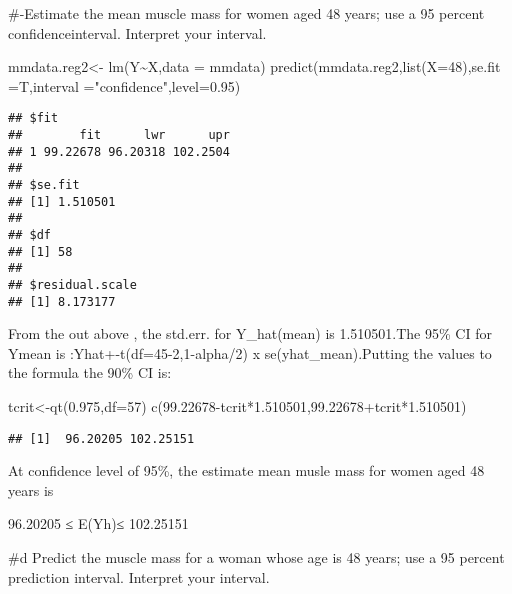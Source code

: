\documentclass[
]{article}
\newenvironment{Shaded}{\begin{snugshade}}{\end{snugshade}}
\newcommand{\AttributeTok}[1]{\textcolor[rgb]{0.77,0.63,0.00}{#1}}
\newcommand{\DecValTok}[1]{\textcolor[rgb]{0.00,0.00,0.81}{#1}}
\newcommand{\FloatTok}[1]{\textcolor[rgb]{0.00,0.00,0.81}{#1}}
\newcommand{\FunctionTok}[1]{\textcolor[rgb]{0.00,0.00,0.00}{#1}}
\newcommand{\NormalTok}[1]{#1}
\newcommand{\OtherTok}[1]{\textcolor[rgb]{0.56,0.35,0.01}{#1}}
\newcommand{\SpecialCharTok}[1]{\textcolor[rgb]{0.00,0.00,0.00}{#1}}
\newcommand{\StringTok}[1]{\textcolor[rgb]{0.31,0.60,0.02}{#1}}
\begin{document}
\#-Estimate the mean muscle mass for women aged 48 years; use a 95
percent confidenceinterval. Interpret your interval.

\begin{Shaded}
\begin{Highlighting}[]
\NormalTok{mmdata.reg2}\OtherTok{\textless{}{-}} \FunctionTok{lm}\NormalTok{(Y}\SpecialCharTok{\textasciitilde{}}\NormalTok{X,}\AttributeTok{data =}\NormalTok{ mmdata)}
\FunctionTok{predict}\NormalTok{(mmdata.reg2,}\FunctionTok{list}\NormalTok{(}\AttributeTok{X=}\DecValTok{48}\NormalTok{),}\AttributeTok{se.fit =}\NormalTok{T,}\AttributeTok{interval =}\StringTok{"confidence"}\NormalTok{,}\AttributeTok{level=}\FloatTok{0.95}\NormalTok{)}
\end{Highlighting}
\end{Shaded}

\begin{verbatim}
## $fit
##        fit      lwr      upr
## 1 99.22678 96.20318 102.2504
## 
## $se.fit
## [1] 1.510501
## 
## $df
## [1] 58
## 
## $residual.scale
## [1] 8.173177
\end{verbatim}

From the out above , the std.err. for Y\_hat(mean) is 1.510501.The 95\%
CI for Ymean is :Yhat+-t(df=45-2,1-alpha/2) x se(yhat\_mean).Putting the
values to the formula the 90\% CI is:

\begin{Shaded}
\begin{Highlighting}[]
\NormalTok{tcrit}\OtherTok{\textless{}{-}}\FunctionTok{qt}\NormalTok{(}\FloatTok{0.975}\NormalTok{,}\AttributeTok{df=}\DecValTok{57}\NormalTok{)}
\FunctionTok{c}\NormalTok{(}\FloatTok{99.22678}\SpecialCharTok{{-}}\NormalTok{tcrit}\SpecialCharTok{*}\FloatTok{1.510501}\NormalTok{,}\FloatTok{99.22678}\SpecialCharTok{+}\NormalTok{tcrit}\SpecialCharTok{*}\FloatTok{1.510501}\NormalTok{)}
\end{Highlighting}
\end{Shaded}

\begin{verbatim}
## [1]  96.20205 102.25151
\end{verbatim}

At confidence level of 95\%, the estimate mean musle mass for women aged
48 years is

96.20205 ≤ E(Yh)≤ 102.25151

\#d Predict the muscle mass for a woman whose age is 48 years; use a 95
percent prediction interval. Interpret your interval.
\end{document}
